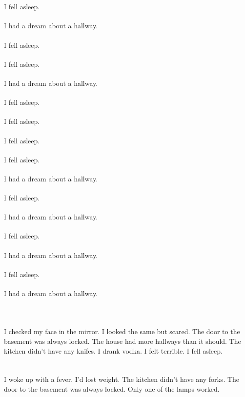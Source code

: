 \documentclass{article}
\begin{document}
    \section{}
    I fell asleep.\\\\I had a dream about a hallway.\\\\ I fell asleep.\\\\ I fell asleep.\\\\I had a dream about a hallway.\\\\ I fell asleep.\\\\ I fell asleep.\\\\ I fell asleep.\\\\ I fell asleep.\\\\I had a dream about a hallway.\\\\ I fell asleep.\\\\I had a dream about a hallway.\\\\ I fell asleep.\\\\I had a dream about a hallway.\\\\ I fell asleep.\\\\I had a dream about a hallway.\\\\ 
    \newpage
    
    \section{}
    I checked my face in the mirror. I looked the same but scared. The door to the basement was always locked. The house had more hallways than it should. The kitchen didn't have any knifes. I drank vodka. I felt terrible. I fell asleep.  
    \newpage
    
    \section{}
    I woke up with a fever. I'd lost weight. The kitchen didn't have any forks. The door to the basement was always locked. Only one of the lamps worked.  
    \newpage
    
\end{document}

